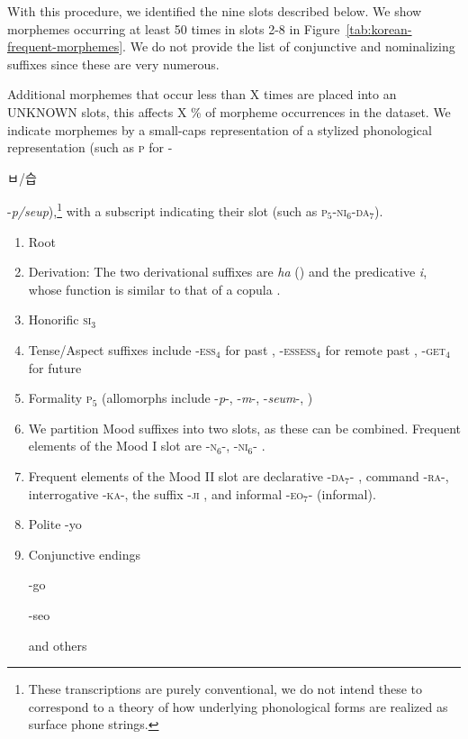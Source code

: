 \documentclass[11pt,letterpaper]{article}
\newcommand{\korean}[1]{\begin{CJK}{UTF8}{mj}#1\end{CJK}}
\begin{document}
With this procedure, we identified the nine slots described below. We show morphemes occurring at least 50 times in slots 2-8 in Figure~\ref{tab:korean-frequent-morphemes}.
We do not provide the list of conjunctive and nominalizing suffixes since these are very numerous.

Additional morphemes that occur less than X times are placed into an UNKNOWN slots, this affects X \% of morpheme occurrences in the dataset.
We indicate morphemes by a small-caps representation of a stylized phonological representation (such as \textsc{p} for -\korean{ㅂ/습}  -\textit{p/seup}),\footnote{These transcriptions are purely conventional, we do not intend these to correspond to a theory of how underlying phonological forms are realized as surface phone strings.} with a subscript indicating their slot (such as \textsc{p}$_5$-\textsc{ni}$_6$-\textsc{da}$_7$).

\begin{enumerate}
    \item Root
    \item Derivation: The two derivational suffixes are \textit{ha} (\citep[4.1.2]{yeon2010korean}) and the predicative \textit{i}, whose function is similar to that of a copula \citep[4.1.4]{yeon2010korean}.
    
    \item Honorific \textsc{si}$_3$ \citep[4.3.2, 4.4.1]{yeon2010korean}
    \item Tense/Aspect suffixes include -\textsc{ess}$_4$ for past \citep[4.5.1.1]{yeon2010korean}, -\textsc{essess}$_4$ for remote past \citep[4.5.1.2]{yeon2010korean}, -\textsc{get}$_4$ for future \citep[4.5.2.1]{yeon2010korean}
    \item Formality \textsc{p}$_5$ (allomorphs include -\textit{p}-, -\textit{m}-, -\textit{seum}-,  \citep[4.3.2]{yeon2010korean})
    \item We partition Mood suffixes into two slots, as these can be combined. Frequent elements of the Mood I slot are -\textsc{n}$_6$-, -\textsc{ni}$_6$- \citep[4.3.2]{yeon2010korean}.
    
    \item Frequent elements of the Mood II slot are declarative -\textsc{da}$_7$- \citep[4.3.2]{yeon2010korean}, command -\textsc{ra}-, interrogative -\textsc{ka}-, the suffix  -\textsc{ji} \citep[4.2.2-3]{yeon2010korean}, and informal -\textsc{eo}$_7$- (informal).
    
    \item Polite -yo
    \item Conjunctive endings
    
    -go
    
    -seo
    
    and others
    
\end{enumerate}
\end{document}
